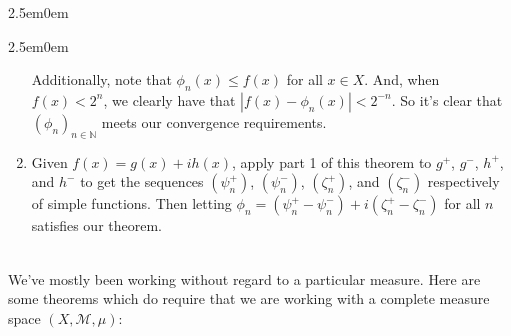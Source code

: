 \documentclass{book}
\newenvironment{myIndent}{%
   \begin{adjustwidth}{2.5em}{0em}%
}{%
   \end{adjustwidth}%
}
\newcommand{\mySepTwo}[1][.]{%
   {\noindent\color{#1}{\rule{6.5in}{0.5mm}}}\\%
}
\newcommand{\retTwo}{\hfill\bigbreak}
\begin{document}
\begin{myIndent}
\begin{myIndent}
\begin{enumerate}
         Additionally, note that $\phi_n(x) \leq f(x)$ for all $x \in X$. And, when $f(x) < 2^{n}$, we clearly have that $|f(x) - \phi_n(x)| < 2^{-n}$. So it's clear that $(\phi_n)_{n \in \mathbb{N}}$ meets our convergence requirements.\newpage

         \item Given $f(x) = g(x) + ih(x)$, apply part 1 of this theorem to $g^+$, $g^-$, $h^+$, and $h^-$ to get the sequences $(\psi^+_n)$, $(\psi^-_n)$, $(\zeta^+_n)$, and $(\zeta^-_n)$ respectively of simple functions. Then letting $\phi_n = (\psi^+_n - \psi^-_n) + i(\zeta^+_n - \zeta^-_n)$ for all $n$ satisfies our theorem.\retTwo
      \end{enumerate}
   \end{myIndent}
\end{myIndent}

\mySepTwo

We've mostly been working without regard to a particular measure. Here are some theorems which do require that we are working with a complete measure space $(X, \mathcal{M}, \mu)$:\retTwo
\end{document}
